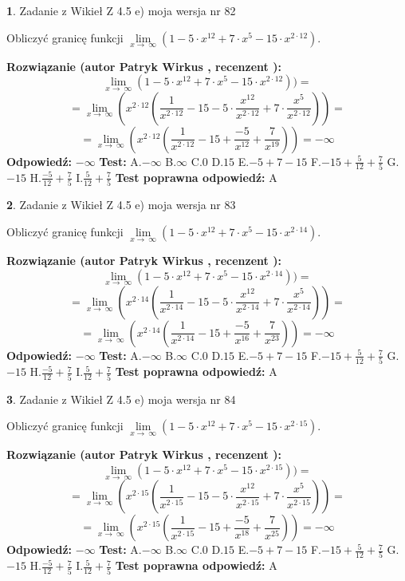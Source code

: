 \documentclass[12pt, a4paper]{article}
\theoremstyle{definition} %
\newtheorem{zad}{}
\newcommand{\zadStart}[1]{\begin{zad}#1\newline}
\newcommand{\zadStop}{\end{zad}}
\newcommand{\rozwStart}[2]{\noindent \textbf{Rozwiązanie (autor #1 , recenzent #2): }\newline}
\newcommand{\rozwStop}{\newline}
\newcommand{\odpStart}{\noindent \textbf{Odpowiedź:}\newline}
\newcommand{\odpStop}{\newline}
\newcommand{\testStart}{\noindent \textbf{Test:}\newline}
\newcommand{\testStop}{\newline}
\newcommand{\kluczStart}{\noindent \textbf{Test poprawna odpowiedź:}\newline}
\newcommand{\kluczStop}{\newline}
\begin{document}
\zadStart{Zadanie z Wikieł Z 4.5 e) moja wersja nr 82}



Obliczyć granicę funkcji  $\lim\limits_{x\to\ \infty}(1 - 5 \cdot x^{12}+7 \cdot x^{5}- 15 \cdot x^{2\cdot12})$.
\zadStop
\rozwStart{Patryk Wirkus}{}
$$\lim\limits_{x\to\ \infty}(1 - 5 \cdot x^{12}+7 \cdot x^{5}- 15 \cdot x^{2\cdot12}))=$$
$$=\lim\limits_{x\to\ \infty}(x^{2\cdot12}(\frac{1}{x^{2\cdot12}}-15 -5 \cdot \frac{x^{12}}{x^{2\cdot12}}+7 \cdot \frac{x^{5}}{x^{2\cdot12}}))=$$
$$=\lim\limits_{x\to\ \infty}(x^{2\cdot12}(\frac{1}{x^{2\cdot12}}-15 + \frac{-5}{x^{12}}+ \frac{7}{x^{19}}))=-\infty$$
\rozwStop
\odpStart
$-\infty$
\odpStop
\testStart
A.$-\infty$ B.$\infty$ C.$0$ D.$15$ E.$-5 + 7 - 15$
F.$-15+\frac{5}{12}+\frac{7}{5}$ G.$-15$
H.$\frac{-5}{12}+\frac{7}{5}$
I.$\frac{5}{12}+\frac{7}{5}$
\testStop
\kluczStart
A
\kluczStop



\zadStart{Zadanie z Wikieł Z 4.5 e) moja wersja nr 83}



Obliczyć granicę funkcji  $\lim\limits_{x\to\ \infty}(1 - 5 \cdot x^{12}+7 \cdot x^{5}- 15 \cdot x^{2\cdot14})$.
\zadStop
\rozwStart{Patryk Wirkus}{}
$$\lim\limits_{x\to\ \infty}(1 - 5 \cdot x^{12}+7 \cdot x^{5}- 15 \cdot x^{2\cdot14}))=$$
$$=\lim\limits_{x\to\ \infty}(x^{2\cdot14}(\frac{1}{x^{2\cdot14}}-15 -5 \cdot \frac{x^{12}}{x^{2\cdot14}}+7 \cdot \frac{x^{5}}{x^{2\cdot14}}))=$$
$$=\lim\limits_{x\to\ \infty}(x^{2\cdot14}(\frac{1}{x^{2\cdot14}}-15 + \frac{-5}{x^{16}}+ \frac{7}{x^{23}}))=-\infty$$
\rozwStop
\odpStart
$-\infty$
\odpStop
\testStart
A.$-\infty$ B.$\infty$ C.$0$ D.$15$ E.$-5 + 7 - 15$
F.$-15+\frac{5}{12}+\frac{7}{5}$ G.$-15$
H.$\frac{-5}{12}+\frac{7}{5}$
I.$\frac{5}{12}+\frac{7}{5}$
\testStop
\kluczStart
A
\kluczStop



\zadStart{Zadanie z Wikieł Z 4.5 e) moja wersja nr 84}



Obliczyć granicę funkcji  $\lim\limits_{x\to\ \infty}(1 - 5 \cdot x^{12}+7 \cdot x^{5}- 15 \cdot x^{2\cdot15})$.
\zadStop
\rozwStart{Patryk Wirkus}{}
$$\lim\limits_{x\to\ \infty}(1 - 5 \cdot x^{12}+7 \cdot x^{5}- 15 \cdot x^{2\cdot15}))=$$
$$=\lim\limits_{x\to\ \infty}(x^{2\cdot15}(\frac{1}{x^{2\cdot15}}-15 -5 \cdot \frac{x^{12}}{x^{2\cdot15}}+7 \cdot \frac{x^{5}}{x^{2\cdot15}}))=$$
$$=\lim\limits_{x\to\ \infty}(x^{2\cdot15}(\frac{1}{x^{2\cdot15}}-15 + \frac{-5}{x^{18}}+ \frac{7}{x^{25}}))=-\infty$$
\rozwStop
\odpStart
$-\infty$
\odpStop
\testStart
A.$-\infty$ B.$\infty$ C.$0$ D.$15$ E.$-5 + 7 - 15$
F.$-15+\frac{5}{12}+\frac{7}{5}$ G.$-15$
H.$\frac{-5}{12}+\frac{7}{5}$
I.$\frac{5}{12}+\frac{7}{5}$
\testStop
\kluczStart
A
\kluczStop
\end{document}
